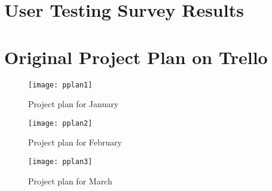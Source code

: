 \chapter{User Testing Survey Results}
\label{appendix:survey}

\chapter{Original Project Plan on Trello}
\label{appendix:plan}
\begin{figure}[h]
	\centering
	\texttt{[image: pplan1]}
	\caption{Project plan for January}
	\label{fig:pplan1}
\end{figure}
\begin{figure}[h]
	\centering
	\texttt{[image: pplan2]}
	\caption{Project plan for February}
	\label{fig:pplan2}
\end{figure}
\begin{figure}[h]
	\centering
	\texttt{[image: pplan3]}
	\caption{Project plan for March}
	\label{fig:pplan3}
\end{figure}